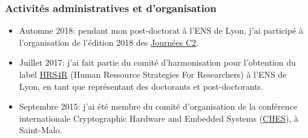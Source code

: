 \documentclass[11pt]{article}
\begin{document}


\subsubsection*{Activités administratives et d'organisation}

\begin{itemize}[label = $\bullet$]
  \item Automne 2018: pendant mon post-doctorat à l'ENS de Lyon, j'ai participé à l'organisation de l'édition 2018 des \href{https://jc2-2018.sciencesconf.org/}{Journées C2}.
\item Juillet 2017: j'ai fait partie du comité d'harmonisation pour l'obtention du label \href{https://euraxess.ec.europa.eu/jobs/hrs4r}{HRS4R} (Human Ressource Strategies For Researchers) à l'ENS de Lyon, en tant que représentant des doctorants et post-doctorants. %
\item Septembre 2015: j'ai été membre du comité d'organisation de la conférence internationale Cryptographic Hardware and Embedded Systems (\href{https://ches.iacr.org/2015/}{CHES}), à Saint-Malo. %
\end{itemize}
\end{document}
